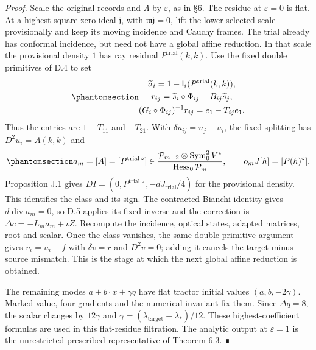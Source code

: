 \documentclass[
  english,
  11pt,
  reqno]{amsart}
\begin{document}
\emph{Proof.} Scale the original records and \(\Lambda\) by
\(\varepsilon\), as in §6. The residue at \(\varepsilon=0\) is flat. At
a highest square-zero ideal \(\mathfrak j\), with
\(\mathfrak m\mathfrak j=0\), lift the lower selected scale
provisionally and keep its moving incidence and Cauchy frames. The trial
already has conformal incidence, but need not have a global affine
reduction. In that scale the provisional density \(1\) has ray residual
\(P^{\mathrm{trial}}(k,k)\). Use the fixed double primitives of D.4 to
set
\begin{equation}\protect\phantomsection\label{eq:gg-source-ward-actual-mismatch}{\begin{gathered}
\widetilde\sigma_i
 =1-\mathsf I_i(P^{\mathrm{trial}}(k,k)), \\
r_{ij}=\widetilde s_i\circ\Phi_{ij}-B_{ij}\widetilde s_j, \\
(G_i\circ\Phi_{ij})^{-1}r_{ij}=e_1-T_{ij}e_1.
\end{gathered}}\end{equation} Thus the entries are \(1-T_{11}\) and \(-T_{21}\). With
\(\delta u_{ij}=u_j-u_i\), the fixed splitting has \(D^2u_i=A(k,k)\) and
\begin{equation}\protect\phantomsection\label{eq:gg-source-ward-hessian-class}{
 a_m=[A]=[P^{\mathrm{trial}\,\circ}]
 \in\frac{\mathcal P_{m-2}\otimes\operatorname{Sym}^2_0V^*}
              {\operatorname{Hess}_0\mathcal P_m},
 \qquad o_mJ[h]=[P(h)^\circ].
}\end{equation} Proposition J.1 gives
\(DI=(0,P^{\mathrm{trial}\,\circ},-dJ_{\mathrm{trial}}/4)\) for the
provisional density. This identifies the class and its sign. The
contracted Bianchi identity gives \(d\operatorname{div}a_m=0\), so D.5
applies its fixed inverse and the correction is
\(\Delta c=-L_ma_m+\iota Z\). Recompute the incidence, optical states,
adapted matrices, root and scalar. Once the class vanishes, the same
double-primitive argument gives \(v_i=u_i-f\) with \(\delta v=r\) and
\(D^2v=0\); adding it cancels the target-minus-source mismatch. This is
the stage at which the next global affine reduction is obtained.

The remaining modes \(a+b\cdot x+\gamma q\) have flat tractor initial
values \((a,b,-2\gamma)\). Marked value, four gradients and the
numerical invariant fix them. Since \(\Delta q=8\), the scalar changes
by \(12\gamma\) and \(\gamma=(\lambda_{\mathrm{target}}-\lambda_*)/12\).
These highest-coefficient formulas are used in this flat-residue
filtration. The analytic output at \(\varepsilon=1\) is the unrestricted
prescribed representative of Theorem 6.3. ∎
\end{document}
